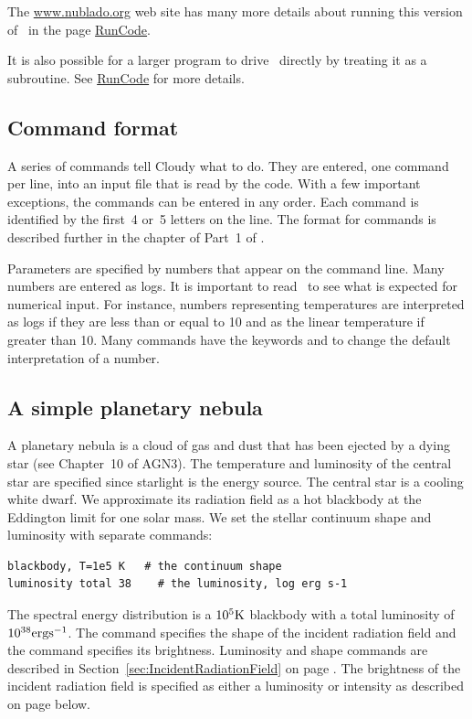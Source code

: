 \documentclass[12pt,twoside]{article}
\begin{document}
{The \href{http://www.nublado.org}{www.nublado.org} web site has many more details
about running this version of \Cloudy\ in the page
\href{https://gitlab.nublado.org/cloudy/cloudy/-/wikis/RunCode}{RunCode}.

It is also possible for a larger program to drive \Cloudy\ directly by
treating it as a subroutine. 
See \href{https://gitlab.nublado.org/cloudy/cloudy/-/wikis/RunCode}{RunCode}
for more details.

\subsection{Command format}

A series of commands tell Cloudy what to do.
They are entered, one command per line,
into an input file that is read by the code.
With a few important
exceptions, the commands can be entered in any order.
Each command is
identified by the first~4 or~5 letters on the line.
The format for commands is described further in the
chapter  of Part~1 of \Hazy.

Parameters are specified by numbers that appear on the command line.
Many numbers are entered as logs.
It is important to read \Hazy\ to see what is
expected for numerical input.
For instance, numbers representing
temperatures are interpreted as logs if they are
less than or equal to 10 and as the linear
temperature if greater than 10.
Many commands have the keywords  and
 to change the default interpretation of a number.

\subsection{A simple planetary nebula}

A planetary nebula is a cloud of gas and dust that has been ejected by
a dying star (see Chapter~10 of AGN3).  The temperature and luminosity of
the central star are specified since starlight is the energy source.  The
central star is a cooling white dwarf.
We approximate its radiation field as a hot blackbody
at the Eddington limit for one solar mass.  We set the stellar continuum
shape and luminosity with separate commands:
\small
\begin{verbatim}
blackbody, T=1e5 K   # the continuum shape
luminosity total 38    # the luminosity, log erg s-1
\end{verbatim}
\normalsize
The spectral energy distribution is a $10^5 \rm{K}$ blackbody
with a total luminosity of $10^{38} \rm{erg s^{-1}}$.
The  command specifies the shape of the incident
radiation field and the  command
specifies its brightness.
Luminosity and shape commands are described in Section~\ref{sec:IncidentRadiationField}
on page \pageref{sec:IncidentRadiationField}.
The brightness of the incident radiation field is specified
as either a luminosity or intensity as described on
page \pageref{sec:LuminosityVsIntensityCases} below.

}
\end{document}

